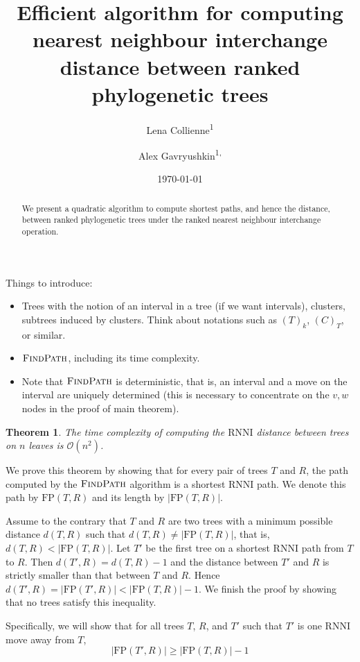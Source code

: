 \documentclass{amsart}
\title[Computing $\rnni$ distance]{Efficient algorithm for computing nearest neighbour interchange distance between ranked phylogenetic trees}
\date{\today}
\author{Lena Collienne\textsuperscript{1}}
\author{Alex Gavryushkin\textsuperscript{1, \Letter}}
\newtheorem{theorem}{Theorem}
\newcommand{\rnni}{\mathrm{RNNI}}
\newcommand{\findpath}{\textsc{FindPath}}
\newcommand{\fp}{\mathrm{FP}}
\renewcommand{\O}{\mathcal O}
\begin{document}
\begin{abstract}
We present a quadratic algorithm to compute shortest paths, and hence the distance, between ranked phylogenetic trees under the ranked nearest neighbour interchange operation.
\end{abstract}


\maketitle

Things to introduce:

\begin{itemize}
\item Trees with the notion of an interval in a tree (if we want intervals), clusters, subtrees induced by clusters.
Think about notations such as $(T)_k$, $(C)_T$, or similar.
\item $\findpath$, including its time complexity.
\item Note that $\findpath$ is deterministic, that is, an interval and a move on the interval are uniquely determined (this is necessary to concentrate on the $v, w$ nodes in the proof of main theorem).
\end{itemize}

\begin{theorem}
The time complexity of computing the $\rnni$ distance between trees on $n$ leaves is $\O(n^2)$.
\end{theorem}

\proof
We prove this theorem by showing that for every pair of trees $T$ and $R$, the path computed by the $\findpath$ algorithm is a shortest $\rnni$ path.
We denote this path by $\fp(T, R)$ and its length by $|\fp(T, R)|$.

Assume to the contrary that $T$ and $R$ are two trees with a minimum possible distance $d(T, R)$ such that $d(T,R) \neq |\fp(T,R)|$, that is, $d(T,R) < |\fp(T,R)|$.
Let $T'$ be the first tree on a shortest $\rnni$ path from $T$ to $R$.
Then $d(T',R) = d(T, R) - 1$ and the distance between $T'$ and $R$ is strictly smaller than that between $T$ and $R$.
Hence $d(T', R) = |\fp(T',R)| < |\fp(T,R)| - 1$.
We finish the proof by showing that no trees satisfy this inequality.

Specifically, we will show that for all trees $T$, $R$, and $T'$ such that $T'$ is one $\rnni$ move away from $T$,
\begin{equation}
	|\fp(T',R)| \geq |\fp(T,R)| - 1
 	\label{eqn:iff_inequality}
\end{equation}
\end{document}
